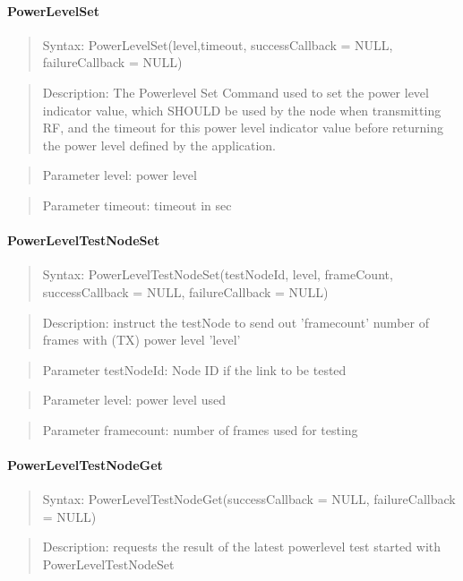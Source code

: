 \paragraph {PowerLevelSet}
\begin{quote} Syntax: PowerLevelSet(level,timeout, successCallback = NULL, failureCallback = NULL)\end{quote}
\begin{quote} Description: The Powerlevel Set Command used to set the power level indicator value, which SHOULD be used by the node when transmitting RF, and the timeout for this power level indicator value before returning the power level defined by the application.\end{quote}
\begin{quote} Parameter level: power level\end{quote}
\begin{quote} Parameter timeout: timeout in sec\end{quote}

\paragraph {PowerLevelTestNodeSet}
\begin{quote} Syntax: PowerLevelTestNodeSet(testNodeId,  level, frameCount, successCallback = NULL, failureCallback = NULL)\end{quote}
\begin{quote} Description: instruct the testNode to send out 'framecount' number of frames with (TX) power level 'level'\end{quote}
\begin{quote} Parameter testNodeId: Node ID if  the link to be tested\end{quote}
\begin{quote} Parameter level: power level used\end{quote}
\begin{quote} Parameter framecount: number of frames used for testing\end{quote}

\paragraph {PowerLevelTestNodeGet}
\begin{quote} Syntax: PowerLevelTestNodeGet(successCallback = NULL, failureCallback = NULL)\end{quote}
\begin{quote} Description: requests the result of the latest powerlevel test started with PowerLevelTestNodeSet\end{quote}



